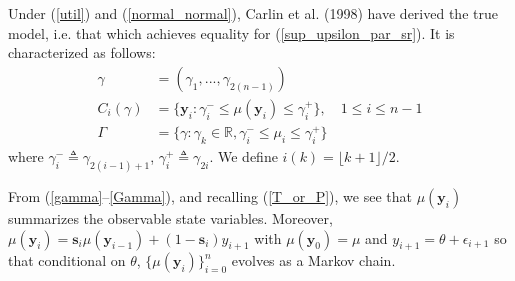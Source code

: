 \documentclass{article}
\begin{document}
Under (\ref{util}) and (\ref{normal_normal}), Carlin et al. (1998)
have derived the true model, i.e. that which achieves equality for
(\ref{sup_upsilon_par_sr}). It is characterized as follows:
\begin{align}\label{gamma}
\gamma&=(\gamma_1,...,\gamma_{2(n-1)})\\
\label{C_i_param} C_{i}(\gamma)&= \{\mathbf{y}_i:
\gamma_{i}^{-}\leq\mu(\mathbf{y}_{i})\leq \gamma_{i}^{+}\}, \quad
1\leq i\leq n-1\\\label{Gamma} \Gamma&=\{\gamma: \gamma_k \in
\mathbb{R}, \gamma_i^{-}\leq \mu_i \leq\gamma_i^{+}\}
\end{align} where $\gamma_{i}^{-}\triangleq\gamma_{2(i-1)+1}$,
$\gamma_{i}^{+}\triangleq \gamma_{2i}$. We define $i(k)=\lfloor k+1
\rfloor/2$.

From (\ref{gamma}--\ref{Gamma}), and recalling (\ref{T_or_P}), we
see that $\mu(\mathbf{y}_{i})$ summarizes the observable state
variables. Moreover, $\mu(\mathbf{y}_i)=\mathbf{s}_i
\mu(\mathbf{y}_{i-1})+(1-\mathbf{s}_i)y_{i+1}$ with
$\mu(\mathbf{y}_0)=\mu$ and $y_{i+1}=\theta+\epsilon_{i+1}$ so that
conditional on $\theta$, $\{\mu(\mathbf{y}_i)\}_{i=0}^{n}$ evolves
as a Markov chain.
\end{document}
